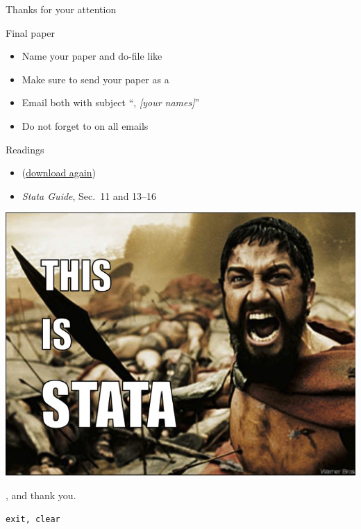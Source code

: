\documentclass[t]{beamer}
\begin{document}
    \begin{frame}[c]{Thanks for your attention}
    
        \begin{alertblock}{Final paper}
            \begin{itemize}
                \item Name your paper and do-file like 
                \item Make sure to send your paper as a 
                \item Email both with subject ``, \textit{[your names]}''
                \item Do not forget to  on all emails
            \end{itemize}
        \end{alertblock}
        
        \begin{block}{Readings}
            \begin{itemize}
            	   \item {} (\href{http://goo.gl/7u8oa}{download again})
                \item \emph{Stata Guide}, Sec.~11 and 13--16
            \end{itemize}
        \end{block}
            
    \end{frame}

	\begin{frame}[c,plain]
		\begin{center}
			\includegraphics[width=\textwidth]{this-is-stata.jpg}
		\end{center}
	\end{frame}
	
	\begin{frame}[c,plain]
		\vfill
		\begin{center}
			{\Large {}, and thank you.}\\
		\end{center}
			\vspace{1em}
			\hspace{.6\paperwidth}
			\texttt{exit, clear}		
		\vfill
	\end{frame}
	
\end{document}
